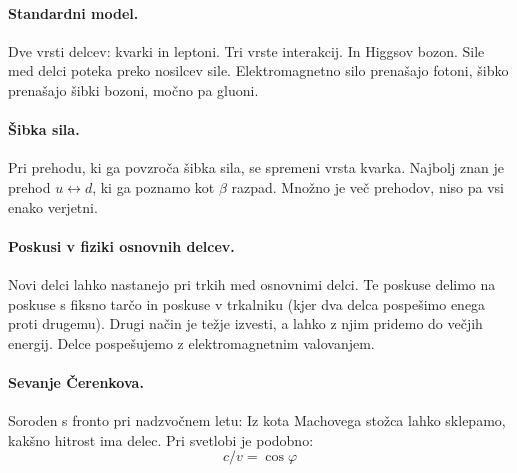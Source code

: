 \documentclass[a4paper]{article}
\begin{document}
\paragraph{Standardni model.} Dve vrsti delcev: kvarki in leptoni. Tri vrste interakcij. In Higgsov bozon.
Sile med delci poteka preko nosilcev sile. Elektromagnetno silo prenašajo fotoni, šibko prenašajo šibki bozoni, močno pa gluoni.
\paragraph{Šibka sila.} Pri prehodu, ki ga povzroča šibka sila, se spremeni vrsta kvarka. Najbolj znan je prehod $u \leftrightarrow d$, ki ga poznamo kot $\beta$ razpad. Množno je več prehodov, niso pa vsi enako verjetni.
\paragraph{Poskusi v fiziki osnovnih delcev.} Novi delci lahko nastanejo pri trkih med osnovnimi delci. Te poskuse delimo na poskuse s fiksno tarčo in poskuse v trkalniku (kjer dva delca pospešimo enega proti drugemu). Drugi način je težje izvesti, a lahko z njim pridemo do večjih energij.
Delce pospešujemo z elektromagnetnim valovanjem.
\paragraph{Sevanje Čerenkova.} Soroden s fronto pri nadzvočnem letu: Iz kota Machovega stožca lahko sklepamo, kakšno hitrost ima delec. Pri svetlobi je podobno: $$c/v = \cos\varphi$$
\end{document}
